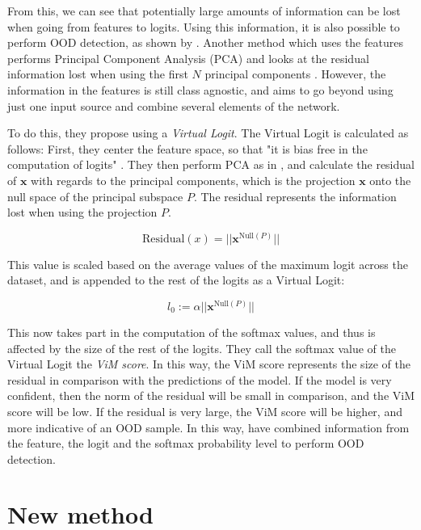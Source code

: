 \documentclass[UKenglish]{uiomasterthesis} %
\theoremstyle{definition}
\begin{document}
From this, we can see that potentially large amounts of information can be lost when going from features to logits. Using this information, it is also possible to perform OOD detection, as shown by \cite{nusa}. Another method which uses the features performs Principal Component Analysis (PCA) and looks at the residual information lost when using the first $N$ principal components \cite{subspace}. However, the information in the features is still class agnostic, and \cite{vim} aims to go beyond using just one input source and combine several elements of the network.

To do this, they propose using a {\it Virtual Logit}. The Virtual Logit is calculated as follows: First, they center the feature space, so that "it is bias free in the computation of logits" \cite{vim}. They then perform PCA as in \cite{subspace}, and calculate the residual of $\bm{x}$ with regards to the principal components, which is the projection $\bm{x}$ onto the null space of the principal subspace $P$. The residual represents the information lost when using the projection $P$.

\begin{equation}
\text{Residual}(x) = || \bm{x}^{\text{Null}(P)}||
\label{virtuallogit}
\end{equation}

This value is scaled based on the average values of the maximum logit across the dataset, and is appended to the rest of the logits as a Virtual Logit:

\begin{equation}
l_0 := \alpha || \bm{x}^{\text{Null}(P)}||
\label{virtuallogit}
\end{equation}

This now takes part in the computation of the softmax values, and thus is affected by the size of the rest of the logits. They call the softmax value of the Virtual Logit the {\it ViM score}. In this way, the ViM score represents the size of the residual in comparison with the predictions of the model. If the model is very confident, then the norm of the residual will be small in comparison, and the ViM score will be low. If the residual is very large, the ViM score will be higher, and more indicative of an OOD sample. In this way, \cite{vim} have combined information from the feature, the logit and the softmax probability level to perform OOD detection.

\chapter{New method} \label{chapter:newmethod}
\end{document}
